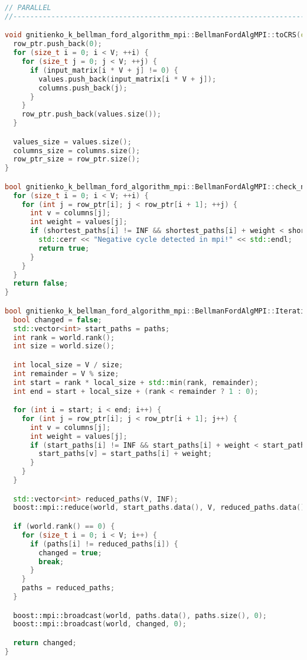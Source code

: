 \documentclass[12pt]{article}
\begin{document}
\begin{lstlisting}[language=C++, caption={Код алгоритма Беллмана-Форда}]
// PARALLEL
//----------------------------------------------------------------------------

void gnitienko_k_bellman_ford_algorithm_mpi::BellmanFordAlgMPI::toCRS(const int* input_matrix) {
  row_ptr.push_back(0);
  for (size_t i = 0; i < V; ++i) {
    for (size_t j = 0; j < V; ++j) {
      if (input_matrix[i * V + j] != 0) {
        values.push_back(input_matrix[i * V + j]);
        columns.push_back(j);
      }
    }
    row_ptr.push_back(values.size());
  }

  values_size = values.size();
  columns_size = columns.size();
  row_ptr_size = row_ptr.size();
}

bool gnitienko_k_bellman_ford_algorithm_mpi::BellmanFordAlgMPI::check_negative_cycle() {
  for (size_t i = 0; i < V; ++i) {
    for (int j = row_ptr[i]; j < row_ptr[i + 1]; ++j) {
      int v = columns[j];
      int weight = values[j];
      if (shortest_paths[i] != INF && shortest_paths[i] + weight < shortest_paths[v]) {
        std::cerr << "Negative cycle detected in mpi!" << std::endl;
        return true;
      }
    }
  }
  return false;
}

bool gnitienko_k_bellman_ford_algorithm_mpi::BellmanFordAlgMPI::Iteration(std::vector<int>& paths) {
  bool changed = false;
  std::vector<int> start_paths = paths;
  int rank = world.rank();
  int size = world.size();

  int local_size = V / size;
  int remainder = V % size;
  int start = rank * local_size + std::min(rank, remainder);
  int end = start + local_size + (rank < remainder ? 1 : 0);

  for (int i = start; i < end; i++) {
    for (int j = row_ptr[i]; j < row_ptr[i + 1]; j++) {
      int v = columns[j];
      int weight = values[j];
      if (start_paths[i] != INF && start_paths[i] + weight < start_paths[v]) {
        start_paths[v] = start_paths[i] + weight;
      }
    }
  }

  std::vector<int> reduced_paths(V, INF);
  boost::mpi::reduce(world, start_paths.data(), V, reduced_paths.data(), boost::mpi::minimum<int>(), 0);

  if (world.rank() == 0) {
    for (size_t i = 0; i < V; i++) {
      if (paths[i] != reduced_paths[i]) {
        changed = true;
        break;
      }
    }
    paths = reduced_paths;
  }

  boost::mpi::broadcast(world, paths.data(), paths.size(), 0);
  boost::mpi::broadcast(world, changed, 0);

  return changed;
}


\end{lstlisting}
\end{document}
